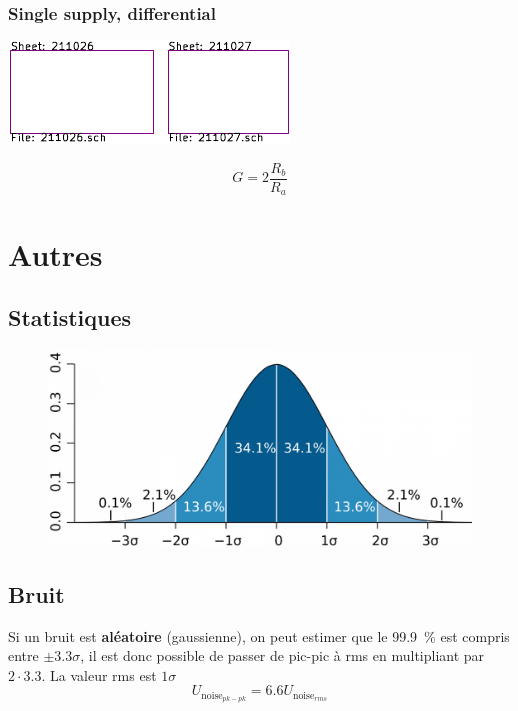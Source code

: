 \documentclass[]{article}
\begin{document}
\subsubsection{Single supply, differential}
\begin{center}
\includegraphics[width=0.7\columnwidth,page=5]{../KiCad/resume-crop.pdf}
\end{center}
$$G=2\frac{R_b}{R_a}$$
\section{Autres}
\subsection{Statistiques}
\begin{figure}[H]
\centering
\includegraphics[width=0.6\columnwidth]{gauss.png}
\end{figure}
\subsection{Bruit}
Si un bruit est \textbf{aléatoire} (gaussienne), on peut estimer que le \SI{99.9}{\percent} est compris entre $\pm 3.3\sigma$, il est donc possible de passer de pic-pic à rms en multipliant par $2\cdot 3.3$. La valeur rms est $1\sigma$
$$U_{\text{noise}_{pk-pk}}=6.6 U_{\text{noise}_{rms}}$$
\end{document}
